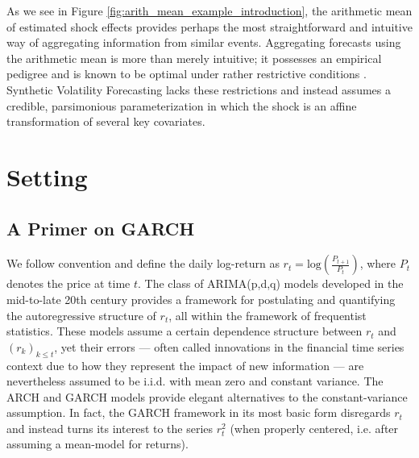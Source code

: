 \documentclass[11pt]{article}
\theoremstyle{definition}
\begin{document}
  As we see in Figure \ref{fig:arith_mean_example_introduction}, the arithmetic mean of estimated shock effects provides perhaps the most straightforward and intuitive way of aggregating information from similar events. Aggregating forecasts using the arithmetic mean is more than merely intuitive; it possesses an empirical pedigree and is known to be optimal under rather restrictive conditions \citep{timmermann2006forecast}.  Synthetic Volatility Forecasting lacks these restrictions and instead assumes a credible, parsimonious parameterization in which the shock is an affine transformation of several key covariates. 


\section{Setting}
\label{section2}

\subsection{A Primer on GARCH}
We follow convention and define the daily log-return as $r_{t} = \text{log}(\frac{P_{t+1}}{P_{t}})$, where $P_{t}$ denotes the price at time $t$.  The class of ARIMA(p,d,q) models developed in the mid-to-late 20th century \citep{box2013box} provides a framework for postulating and quantifying the autoregressive structure of $r_{t}$, all within the framework of frequentist statistics.  These models assume a certain dependence structure between $r_{t}$ and $(r_{k})_{k\leq t}$, yet their errors --- often called innovations in the financial time series context due to how they represent the impact of new information --- are nevertheless assumed to be i.i.d. with mean zero and constant variance.  The ARCH \citep{engle1982autoregressive} and GARCH \citep{bollerslev1986generalized} models provide elegant alternatives to the constant-variance assumption.  In fact, the GARCH framework in its most basic form disregards $r_{t}$ and instead turns its interest to the series $r_{t}^{2}$ (when properly centered, i.e. after assuming a mean-model for returns).  
\end{document}
